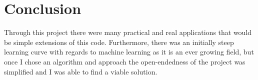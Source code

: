 \documentclass[12pt]{report}
\begin{document}
\section{Conclusion}
Through this project there were many practical and real applications that would be simple extensions of this code. Furthermore, there was an initially steep learning curve with regards to machine learning as it is an ever growing field, but once I chose an algorithm and approach the open-endedness of the project was simplified and I was able to find a viable solution.
\end{document}
